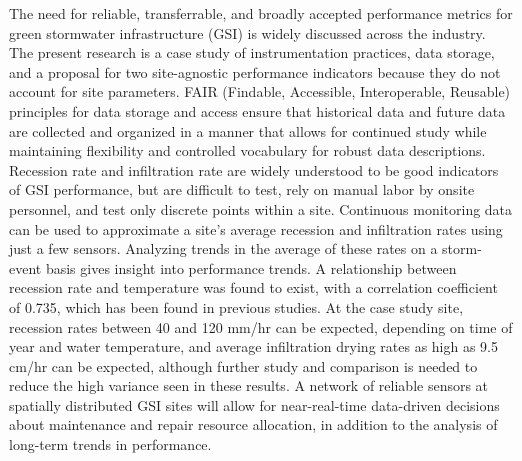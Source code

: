 %
\label{sec:abstract}

The need for reliable, transferrable, and broadly accepted performance metrics for green stormwater infrastructure (GSI) is widely discussed across the industry.
The present research is a case study of instrumentation practices, data storage, and a proposal for two site-agnostic performance indicators because they do not account for site parameters.
FAIR (Findable, Accessible, Interoperable, Reusable) principles for data storage and access ensure that historical data and future data are collected and organized in a manner that allows for continued study while maintaining flexibility and controlled vocabulary for robust data descriptions.
Recession rate and infiltration rate are widely understood to be good indicators of GSI performance, but are difficult to test, rely on manual labor by onsite personnel, and test only discrete points within a site.
Continuous monitoring data can be used to approximate a site's average recession and infiltration rates using just a few sensors.
Analyzing trends in the average of these rates on a storm-event basis gives insight into performance trends.
A relationship between recession rate and temperature was found to exist, with a correlation coefficient of 0.735, which has been found in previous studies.
At the case study site, recession rates between 40 and 120 mm/hr can be expected, depending on time of year and water temperature, and average infiltration drying rates as high as 9.5 cm/hr can be expected, although further study and comparison is needed to reduce the high variance seen in these results.
A network of reliable sensors at spatially distributed GSI sites will allow for near-real-time data-driven decisions about maintenance and repair resource allocation, in addition to the analysis of long-term trends in performance.
